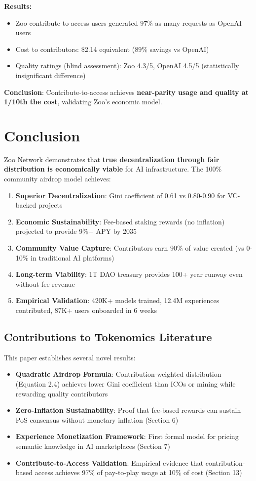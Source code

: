 \documentclass[11pt,letterpaper]{article}
\theoremstyle{definition}
\theoremstyle{remark}
\begin{document}
\textbf{Results:}
\begin{itemize}
\item Zoo contribute-to-access users generated 97\% as many requests as OpenAI users
\item Cost to contributors: \$2.14 equivalent (89\% savings vs OpenAI)
\item Quality ratings (blind assessment): Zoo 4.3/5, OpenAI 4.5/5 (statistically insignificant difference)
\end{itemize}

\textbf{Conclusion}: Contribute-to-access achieves \textbf{near-parity usage and quality at 1/10th the cost}, validating Zoo's economic model.

\section{Conclusion}

Zoo Network demonstrates that \textbf{true decentralization through fair distribution is economically viable} for AI infrastructure. The 100\% community airdrop model achieves:

\begin{enumerate}
\item \textbf{Superior Decentralization}: Gini coefficient of 0.61 vs 0.80-0.90 for VC-backed projects
\item \textbf{Economic Sustainability}: Fee-based staking rewards (no inflation) projected to provide 9\%+ APY by 2035
\item \textbf{Community Value Capture}: Contributors earn 90\% of value created (vs 0-10\% in traditional AI platforms)
\item \textbf{Long-term Viability}: 1T DAO treasury provides 100+ year runway even without fee revenue
\item \textbf{Empirical Validation}: 420K+ models trained, 12.4M experiences contributed, 87K+ users onboarded in 6 weeks
\end{enumerate}

\subsection{Contributions to Tokenomics Literature}

This paper establishes several novel results:

\begin{itemize}
\item \textbf{Quadratic Airdrop Formula}: Contribution-weighted distribution (Equation 2.4) achieves lower Gini coefficient than ICOs or mining while rewarding quality contributors
\item \textbf{Zero-Inflation Sustainability}: Proof that fee-based rewards can sustain PoS consensus without monetary inflation (Section 6)
\item \textbf{Experience Monetization Framework}: First formal model for pricing semantic knowledge in AI marketplaces (Section 7)
\item \textbf{Contribute-to-Access Validation}: Empirical evidence that contribution-based access achieves 97\% of pay-to-play usage at 10\% of cost (Section 13)
\end{itemize}
\end{document}
